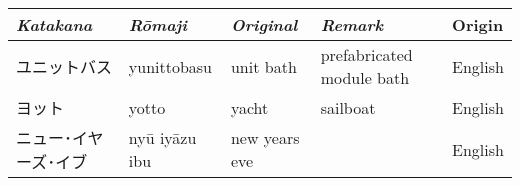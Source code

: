 \newpage
\Padding
\begin{longtable}[c]{p{3.9cm}p{2.4cm}p{2.6cm}p{4.8cm}p{1.3cm}}
\textit{Katakana}&\textit{Rōmaji}&\textit{Original}&\textit{Remark}&Origin\\\hline
ユニットバス        &yunittobasu  &unit bath    &prefabricated module bath&English\\
ヨット              &yotto        &yacht        &sailboat                 &English\\
ニュー･イヤーズ･イブ&nyū iyāzu ibu&new years eve&                         &English\\
\end{longtable}



\newpage
